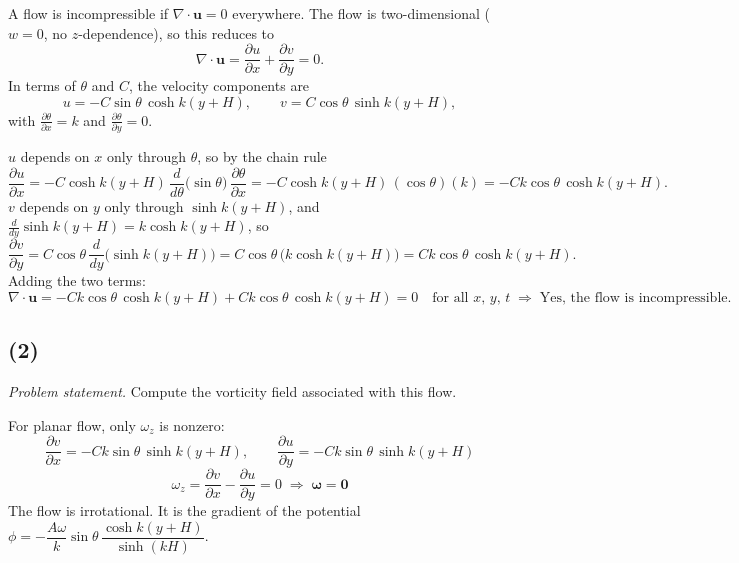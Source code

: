 \documentclass[11pt]{article}
\newcommand{\pd}[2]{\frac{\partial #1}{\partial #2}}
\newcommand{\vect}[1]{\mathbf{#1}}
\begin{document}
\medskip
\noindent A flow is incompressible if $\nabla\cdot\vect u = 0$ everywhere. The flow is two-dimensional
($w = 0$, no $z$-dependence), so this reduces to
\begin{equation*}
\nabla\cdot\vect u = \pd{u}{x} + \pd{v}{y} = 0.
\end{equation*}
In terms of $\theta$ and $C$, the velocity components are
\begin{equation*}
u = -C\sin\theta\,\cosh k(y+H), \qquad
v = C\cos\theta\,\sinh k(y+H),
\end{equation*}
with $\pd{\theta}{x} = k$ and $\pd{\theta}{y} = 0$.

\medskip
\noindent $u$ depends on $x$ only through $\theta$, so by the chain rule
\begin{equation*}
\pd{u}{x} = -C\cosh k(y+H)\,\frac{d}{d\theta}\big(\sin\theta\big)\,\pd{\theta}{x}
= -C\cosh k(y+H)\,(\cos\theta)(k)
= -Ck\cos\theta\,\cosh k(y+H).
\end{equation*}
$v$ depends on $y$ only through $\sinh k(y+H)$, and $\frac{d}{dy}\sinh k(y+H) = k\cosh k(y+H)$, so
\begin{equation*}
\pd{v}{y} = C\cos\theta\,\frac{d}{dy}\Big(\sinh k(y+H)\Big)
= C\cos\theta\,\big(k\cosh k(y+H)\big)
= Ck\cos\theta\,\cosh k(y+H).
\end{equation*}
Adding the two terms:
\begin{equation*}
\nabla\cdot\vect u
= -Ck\cos\theta\,\cosh k(y+H) + Ck\cos\theta\,\cosh k(y+H) = 0
\quad \text{for all } x,\, y,\, t
\;\Rightarrow\;
\boxed{\text{Yes, the flow is incompressible.}}
\end{equation*}

\subsection*{(2)}

\noindent\textit{Problem statement.} Compute the vorticity field associated with this flow.

\medskip
\noindent For planar flow, only $\omega_z$ is nonzero:
\begin{equation*}
\pd{v}{x} = -Ck\sin\theta\,\sinh k(y+H), \qquad
\pd{u}{y} = -Ck\sin\theta\,\sinh k(y+H)
\end{equation*}
\begin{equation*}
\omega_z = \pd{v}{x} - \pd{u}{y} = 0
\;\Rightarrow\;
\boxed{\boldsymbol\omega = \vect 0}
\end{equation*}
The flow is irrotational. It is the gradient of the potential
$\phi = -\dfrac{A\omega}{k}\sin\theta\,\dfrac{\cosh k(y+H)}{\sinh(kH)}$.
\end{document}
